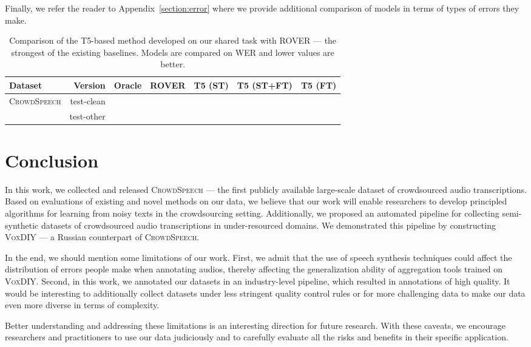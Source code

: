 \documentclass{article}
\newcommand{\speech}{\textsc{CrowdSpeech}}
\newcommand{\vox}{\textsc{VoxDIY}}
\begin{document}
Finally, we refer the reader to Appendix~\ref{section:error} where we provide additional comparison of models in terms of types of errors they make.

\begin{table}[t]
\centering
\caption{\label{table:new_results}Comparison of the T5-based method developed on our shared task with ROVER --- the strongest of the existing baselines. Models are compared on WER and lower values are better.}
\begin{tabular}{lrrrrrr}\toprule
\textbf{Dataset} & \textbf{Version}  & \textbf{Oracle} & \textbf{ROVER} & \textbf{T5 (ST)} & \textbf{T5 (ST+FT)} & \textbf{T5 (FT)} \\\midrule
\multirow{2}{*}{\speech} & test-clean &   &  &  &  &  \\
& test-other &  &  &  &  &  \\
\midrule
\end{tabular}
\end{table}


\section{Conclusion}
\label{section:conclusion}

In this work, we collected and released \speech{} --- the first publicly available large-scale dataset of crowdsourced audio transcriptions. Based on evaluations of existing and novel methods on our data, we believe that our work will enable researchers to develop principled algorithms for learning from noisy texts in the crowdsourcing setting. Additionally, we proposed an automated pipeline for collecting semi-synthetic datasets of crowdsourced audio transcriptions in under-resourced domains. We demonstrated this pipeline by constructing \vox{} --- a Russian counterpart of \speech{}.

In the end, we should mention some limitations of our work. First, we admit that the use of speech synthesis techniques could affect the distribution of errors people make when annotating audios, thereby affecting the generalization ability of aggregation tools trained on \vox{}. Second, in this work, we annotated our datasets in an industry-level pipeline, which resulted in annotations of high quality. It would be interesting to additionally collect datasets under less stringent quality control rules or for more challenging data to make our data even more diverse in terms of complexity. 

Better understanding and addressing these limitations is an interesting direction for future research. With these caveats, we encourage researchers and practitioners to use our data judiciously and to carefully evaluate all the risks and benefits in their specific application.
\end{document}
